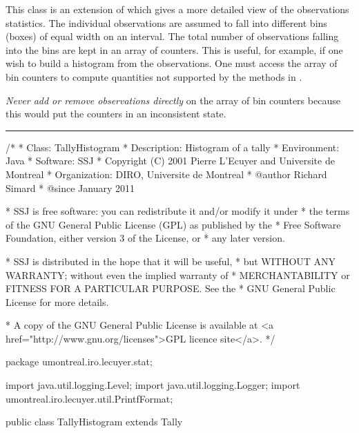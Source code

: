 
This class is an extension of  which gives a more detailed view
of the observations statistics. The individual observations are assumed to
fall into different bins (boxes) of equal width on an interval.
The total number of observations falling into the bins are kept in an array
of counters. This is useful, for example, if one wish to build a histogram
from the observations. One must access the array of bin counters
to compute quantities not supported by the methods in .

\emph{Never add or remove observations directly} on the array of
bin counters because this would put the  counters in an
inconsistent state.


\bigskip\hrule

\begin{code}
\begin{hide}
/*
 * Class:        TallyHistogram
 * Description:  Histogram of a tally
 * Environment:  Java
 * Software:     SSJ
 * Copyright (C) 2001  Pierre L'Ecuyer and Universite de Montreal
 * Organization: DIRO, Universite de Montreal
 * @author       Richard Simard
 * @since        January 2011

 * SSJ is free software: you can redistribute it and/or modify it under
 * the terms of the GNU General Public License (GPL) as published by the
 * Free Software Foundation, either version 3 of the License, or
 * any later version.

 * SSJ is distributed in the hope that it will be useful,
 * but WITHOUT ANY WARRANTY; without even the implied warranty of
 * MERCHANTABILITY or FITNESS FOR A PARTICULAR PURPOSE.  See the
 * GNU General Public License for more details.

 * A copy of the GNU General Public License is available at
   <a href="http://www.gnu.org/licenses">GPL licence site</a>.
 */
\end{hide}
package umontreal.iro.lecuyer.stat;\begin{hide}
import java.util.logging.Level;
import java.util.logging.Logger;
import umontreal.iro.lecuyer.util.PrintfFormat;
\end{hide}


public class TallyHistogram extends Tally \begin{hide} {
   private int[] co;         // counter: num of values in bin[i]
   private int numBins;      // number of bins
   private double m_h;       // width of 1 bin
   private double m_a;       // left boundary of first bin
   private double m_b;       // right boundary of last bin
   private Logger log = Logger.getLogger ("umontreal.iro.lecuyer.stat");
\end{hide}
\end{code}

